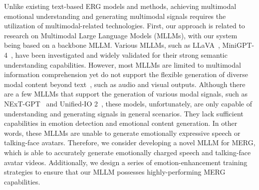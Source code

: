 Unlike existing text-based ERG models and methods, achieving multimodal emotional understanding and generating multimodal signals requires the utilization of multimodal-related technologies. 
First, our approach is related to research on Multimodal Large Language Models (MLLMs), with our system being based on a backbone MLLM. 
Various MLLMs, such as LLaVA~\cite{liu2024visual}, MiniGPT-4~\cite{zhu2023minigpt}, have been investigated and widely validated for their strong semantic understanding capabilities. 
However, most MLLMs are limited to multimodal information comprehension yet do not support the flexible generation of diverse modal content beyond text~\cite{li2023blip,su2023pandagpt,bai2023qwen}, such as audio and visual outputs.
Although there are a few MLLMs that support the generation of various modal signals, such as NExT-GPT~\cite{wu24next} and Unified-IO 2~\cite{lu2024unified}, these models, unfortunately, are only capable of understanding and generating signals in general scenarios. 
They lack sufficient capabilities in emotion detection and emotional content generation. 
In other words, these MLLMs are unable to generate emotionally expressive speech or talking-face avatars.
Therefore, we consider developing a novel MLLM for MERG, which is able to accurately generate emotionally charged speech and talking-face avatar videos. 
Additionally, we design a series of emotion-enhancement training strategies to ensure that our MLLM possesses highly-performing MERG capabilities.